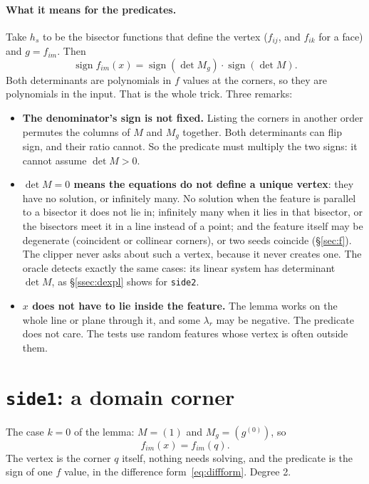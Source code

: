 \documentclass[11pt,a4paper]{article}
\newcommand{\code}[1]{\texttt{#1}}
\newcommand{\sgn}{\operatorname{sign}}
\newcommand{\secref}[1]{\S\ref{#1}}
\theoremstyle{remark}
\begin{document}
\paragraph{What it means for the predicates.} Take $h_s$ to be the bisector functions that
define the vertex ($f_{ij}$, and $f_{ik}$ for a face) and $g = f_{im}$. Then
\[
  \sgn f_{im}(x) = \sgn(\det M_g)\cdot\sgn(\det M).
\]
Both determinants are polynomials in $f$ values at the corners, so they are polynomials in the
input. That is the whole trick. Three remarks:
\begin{itemize}
  \item \textbf{The denominator's sign is not fixed.} Listing the corners in another order permutes
    the columns of $M$ and $M_g$ together. Both determinants can flip sign, and their ratio
    cannot. So the predicate must multiply the two signs: it cannot assume $\det M > 0$.
  \item \textbf{$\det M = 0$ means the equations do not define a unique vertex}: they have no
    solution, or infinitely many. No solution when the feature is parallel to a bisector it does
    not lie in; infinitely many when it lies in that bisector, or the bisectors meet it in a line
    instead of a point; and the feature itself may be degenerate (coincident or collinear corners),
    or two seeds coincide (\secref{sec:f}). The clipper never asks about such a vertex, because it
    never creates one. The oracle detects exactly the same cases: its linear system has
    determinant $\det M$, as \secref{ssec:dexpl} shows for \code{side2}.
  \item \textbf{$x$ does not have to lie inside the feature.} The lemma works on the whole line or
    plane through it, and some $\lambda_r$ may be negative. The predicate does not care. The tests
    use random features whose vertex is often outside them.
\end{itemize}

\section{\texorpdfstring{\code{side1}}{side1}: a domain corner}\label{sec:side1}

The case $k = 0$ of the lemma: $M = (1)$ and $M_g = (g^{(0)})$, so
\[
  f_{im}(x) = f_{im}(q).
\]
The vertex is the corner $q$ itself, nothing needs solving, and the predicate is the sign of one
$f$ value, in the difference form~\eqref{eq:diffform}. Degree 2.
\end{document}

